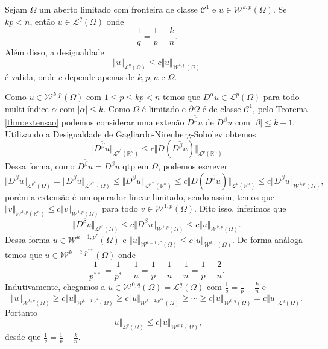 \documentclass[a4paper, 11pt]{book}
\theoremstyle{definition}
\newcommand{\bR}{\mathbb{R}}
\newcommand{\cC}{\mathcal{C}}
\newcommand{\cL}{\mathcal{L}}
\newcommand{\cW}{\mathcal{W}}
\begin{document}
\begin{tbox} \label{thm:geral-1}
    Sejam $\Omega$ um aberto limitado com fronteira de classe $\cC^1$ e $u \in \cW^{k,p}(\Omega)$.
    Se $kp < n$, então $u \in \cL^q(\Omega)$ onde
    \[
        \frac{1}{q} = \frac{1}{p} - \frac{k}{n}.
    \]
    Além disso, a desigualdade
    \[
        \Vert u \Vert_{\cL^q(\Omega)} \leqslant c \Vert u \Vert_{\cW^{k,p}(\Omega)}
    \]
    é valida, onde $c$ depende apenas de $k, p, n$ e $\Omega$.
\end{tbox}
\begin{prf}
    Como $u \in \cW^{k,p}(\Omega)$ com $1 \leqslant p \leqslant kp < n$ temos que $D^\alpha u \in \cL^p(\Omega)$ para todo multi-índice $\alpha$ com $|\alpha| \leqslant k$. 
    Como $\Omega$ é limitado e $\partial\Omega$ é de classe $\cC^1$, pelo Teorema \ref{thm:extensao} podemos considerar uma extenão $\overline{D^\beta u}$ de $D^\beta u$ com $|\beta| \leqslant k -1$. 
    Utilizando a Desigualdade de Gagliardo-Nirenberg-Sobolev obtemos
    \[
        \Vert \overline{D^\beta u} \Vert_{\cL^{p^*}(\bR^n)} \leqslant c \Vert D (\overline{D^\beta u}) \Vert_{\cL^p(\bR^ n)}
    \]
    Dessa forma, como $\overline{D^\beta u} = D^\beta u$ qtp em $\Omega$, podemos escrever
    \[
        \Vert D^\beta u \Vert_{\cL^{p^*}(\Omega)} = \Vert \overline{D^\beta u} \Vert_{\cL^{p*}(\Omega)} \leqslant \Vert \overline{D^\beta u} \Vert_{\cL^{p*}(\bR^n)} \leqslant c \Vert D (\overline{D^\beta}u) \Vert_{\cL^p(\bR^ n)} \leqslant c \Vert \overline{D^\beta u} \Vert_{\cW^{1,p}(\Omega)},
    \]
    porém a extensão é um operador linear limitado, sendo assim, temos que $\Vert \bar v \Vert_{\cW^{1,p}(\bR^n)} \leqslant c \Vert v \Vert_{\cW^{1,p}(\Omega)}$ para todo $v \in \cW^{1,p}(\Omega)$. Dito isso, inferimos que
    \[
        \Vert D^\beta u \Vert_{\cL^{p^*}(\Omega)} \leqslant c \Vert D^\beta u \Vert_{\cW^{1,p}(\Omega)} \leqslant c \Vert u \Vert_{\cW^{k,p}(\Omega)}.
    \]
    Dessa forma $u \in \cW^{k-1,p^*}(\Omega)$ e $\Vert u \Vert_{\cW^{k-1,p^*}(\Omega)} \leqslant c \Vert u \Vert_{\cW^{k,p}(\Omega)}$.
    De forma análoga temos que $u \in \cW^{k-2,p^{**}}(\Omega)$ onde
    \[
        \frac{1}{p^{**}} = \frac{1}{p^*} - \frac{1}{n} = \frac{1}{p} - \frac{1}{n} - \frac{1}{n} = \frac{1}{p} - \frac{2}{n}.
    \]
    Indutivamente, chegamos a $u \in \cW^{0,q}(\Omega) = \cL^q(\Omega)$ com $\frac{1}{q} = \frac{1}{p} - \frac{k}{n}$ e
    \[
        \Vert u \Vert_{\cW^{k,p}(\Omega)} \geqslant c \Vert u \Vert_{\cW^{k-1,p^*}(\Omega)} \geqslant c \Vert u \Vert_{\cW^{k-2,p^{**}}(\Omega)} \geqslant \cdots\geqslant c \Vert u \Vert_{\cW^{0,q}(\Omega)} = c\Vert u \Vert_{\cL^q(\Omega)}.
    \]
    Portanto
    \[
        \Vert u \Vert_{\cL^q(\Omega)} \leqslant c \Vert u \Vert_{\cW^{k,p}(\Omega)},
    \]
    desde que $\frac{1}{q} = \frac{1}{p} - \frac{k}{n}$.
\end{prf}
\end{document}
